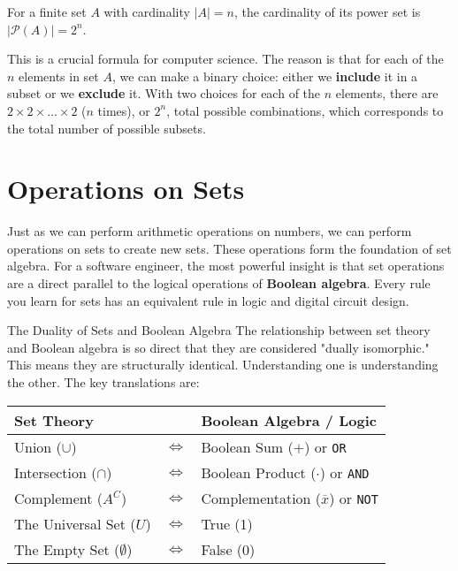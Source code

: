 \begin{remark}
    For a finite set $A$ with cardinality $|A| = n$, the cardinality of its power set is $|\mathcal{P}(A)| = 2^n$.
    
    This is a crucial formula for computer science. The reason is that for each of the $n$ elements in set $A$, we can make a binary choice: either we \textbf{include} it in a subset or we \textbf{exclude} it. With two choices for each of the $n$ elements, there are $2 \times 2 \times \dots \times 2$ ($n$ times), or $2^n$, total possible combinations, which corresponds to the total number of possible subsets.
\end{remark}



\section{Operations on Sets}
Just as we can perform arithmetic operations on numbers, we can perform operations on sets to create new sets. These operations form the foundation of set algebra. For a software engineer, the most powerful insight is that set operations are a direct parallel to the logical operations of \textbf{Boolean algebra}. Every rule you learn for sets has an equivalent rule in logic and digital circuit design.

\begin{custombox}{The Duality of Sets and Boolean Algebra}
    The relationship between set theory and Boolean algebra is so direct that they are considered "dually isomorphic." This means they are structurally identical. Understanding one is understanding the other. The key translations are:
    \begin{center}
    \renewcommand{\arraystretch}{1.3}
    \begin{tabular}{lcl}
        \textbf{Set Theory} & & \textbf{Boolean Algebra / Logic} \\
        \hline
        Union ($\cup$) & $\iff$ & Boolean Sum ($+$) or \texttt{OR} \\
        Intersection ($\cap$) & $\iff$ & Boolean Product ($\cdot$) or \texttt{AND} \\
        Complement ($A^C$) & $\iff$ & Complementation ($\overline{x}$) or \texttt{NOT} \\
        The Universal Set ($U$) & $\iff$ & True (1) \\
        The Empty Set ($\emptyset$) & $\iff$ & False (0) \\
    \end{tabular}
    \end{center}
\end{custombox}

